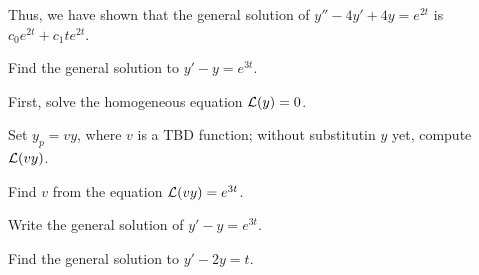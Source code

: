 \begin{applicationActivities}
\begin{observation}
Thus, we have shown that the general solution of \(y''-4y'+4y=e^{2t}\) is \(c_0e^{2t}+c_1te^{2t}\).
\end{observation}

\begin{activity}{15}
Find the general solution to \(y'-y=e^{3t}\).
\begin{subactivity}
First, solve the homogeneous equation \(\mathcal{L}(y)=0\).
\end{subactivity}
\begin{subactivity}
Set \(y_p=vy\), where  \(v\) is a TBD function; without substitutin \(y\) yet, compute \(\mathcal{L}(vy) \).
\end{subactivity}
\begin{subactivity}
Find \(v\) from the equation \(\mathcal{L}(vy)=e^{3t}\).
\end{subactivity}
\begin{subactivity}
Write the general solution of \(y'-y=e^{3t}\).
\end{subactivity}
\end{activity}

\begin{activity}{10}
Find the general solution to \(y'-2y=t\).
\end{activity}


\end{applicationActivities}
